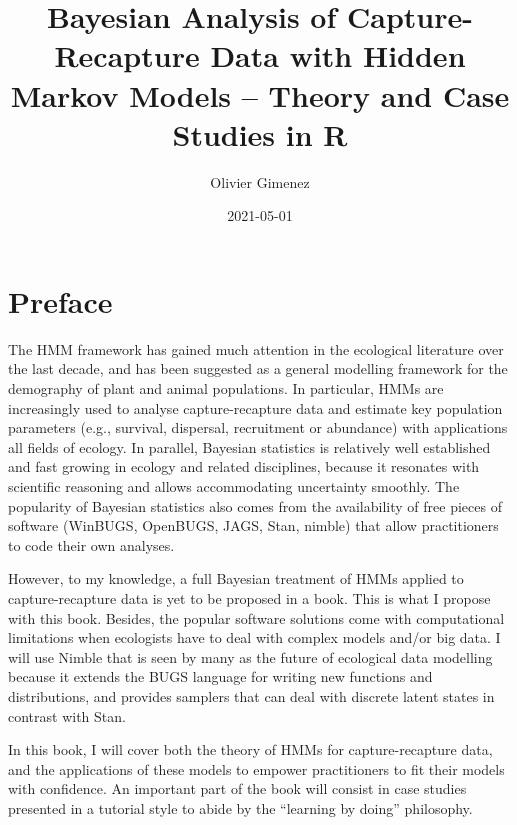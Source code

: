 \documentclass[
  12pt,
]{krantz}
\title{Bayesian Analysis of Capture-Recapture Data with Hidden Markov Models -- Theory and Case Studies in R}
\author{Olivier Gimenez}
\date{2021-05-01}
\begin{document}
\maketitle

\thispagestyle{empty}

\setlength{\abovedisplayskip}{-5pt}
\setlength{\abovedisplayshortskip}{-5pt}

{
\hypersetup{linkcolor=}
\setcounter{tocdepth}{2}
\tableofcontents
}
\listoftables
\listoffigures
\hypertarget{preface}{%
\chapter*{Preface}\label{preface}}


The HMM framework has gained much attention in the ecological literature over the last decade, and has been suggested as a general modelling framework for the demography of plant and animal populations. In particular, HMMs are increasingly used to analyse capture-recapture data and estimate key population parameters (e.g., survival, dispersal, recruitment or abundance) with applications all fields of ecology. In parallel, Bayesian statistics is relatively well established and fast growing in ecology and related disciplines, because it resonates with scientific reasoning and allows accommodating uncertainty smoothly. The popularity of Bayesian statistics also comes from the availability of free pieces of software (WinBUGS, OpenBUGS, JAGS, Stan, nimble) that allow practitioners to code their own analyses.

However, to my knowledge, a full Bayesian treatment of HMMs applied to capture-recapture data is yet to be proposed in a book. This is what I propose with this book. Besides, the popular software solutions come with computational limitations when ecologists have to deal with complex models and/or big data. I will use Nimble that is seen by many as the future of ecological data modelling because it extends the BUGS language for writing new functions and distributions, and provides samplers that can deal with discrete latent states in contrast with Stan.

In this book, I will cover both the theory of HMMs for capture-recapture data, and the applications of these models to empower practitioners to fit their models with confidence. An important part of the book will consist in case studies presented in a tutorial style to abide by the ``learning by doing'' philosophy.
\end{document}
